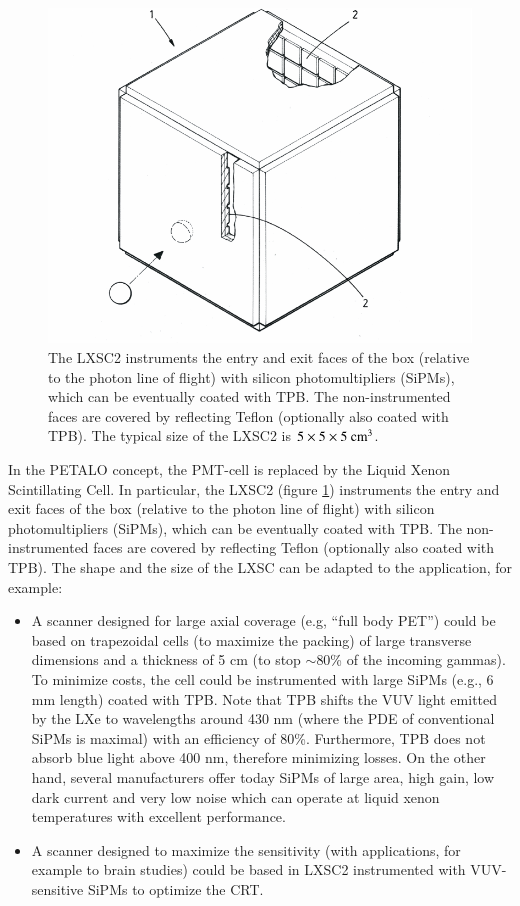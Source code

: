 \documentclass[review]{elsarticle}
\begin{document}
\begin{figure}[!htbp]
	\centering
	\includegraphics[scale=0.6]{../img/LXSC2.pdf}
	\caption{The LXSC2 instruments the entry and exit faces of the box (relative to the photon line of flight) with silicon photomultipliers (SiPMs), which can be eventually coated with TPB. The non-instrumented faces are covered by reflecting Teflon (optionally also coated with TPB). The typical size of the LXSC2
	is $5 \times 5 \times 5 {\rm ~cm^3}$.}\label{fig.box} 
\end{figure}

In the PETALO concept, the PMT-cell is replaced by the Liquid Xenon Scintillating Cell. In particular, the LXSC2 
(figure \ref{fig.box}) instruments the entry and exit faces of the box (relative to the photon line of flight) with silicon photomultipliers (SiPMs), which can be eventually coated with TPB. The non-instrumented faces are covered by reflecting Teflon (optionally also coated with TPB). The shape and the size of the LXSC can be adapted to the application, for example:
\begin{itemize}
\item A scanner designed for large axial coverage (e.g, ``full body PET'') could be based on trapezoidal cells (to maximize the packing) of large transverse dimensions and a thickness of 5 cm (to stop $\sim$80\% of the incoming gammas). To minimize costs, the cell could be instrumented with large
SiPMs (e.g., 6 mm length) coated with TPB.  Note that TPB shifts the VUV light emitted by the LXe  to wavelengths around 430 nm (where the PDE of conventional SiPMs is maximal) with an efficiency of 
80\%. Furthermore, TPB does not absorb blue light above 400 nm, therefore minimizing losses. On the other hand, several manufacturers offer today SiPMs of large area, high gain, low dark current and very low noise which can operate at liquid xenon temperatures with excellent performance.
\item A scanner designed to maximize the sensitivity (with applications, for example
to brain studies) could be based in LXSC2 instrumented with VUV-sensitive SiPMs to optimize the CRT. 
\end{itemize}
\end{document}
